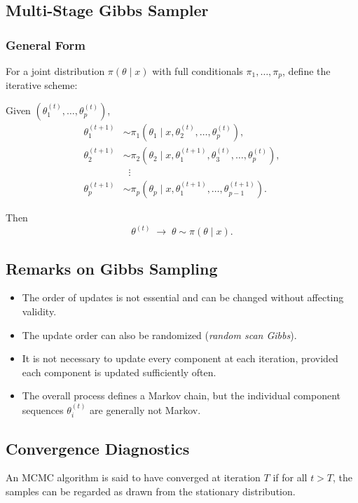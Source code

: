 \documentclass[12pt,oneside]{book}
\numberwithin{equation}{section}
\theoremstyle{definition}
\theoremstyle{plain}
\theoremstyle{remark}
\begin{document}
\subsection{Multi-Stage Gibbs Sampler}

\subsubsection*{General Form}

For a joint distribution $\pi(\theta \mid x)$ with full conditionals $\pi_1, \ldots, \pi_p$, define the iterative scheme:

Given $(\theta_1^{(t)}, \ldots, \theta_p^{(t)})$,
\[
\begin{aligned}
\theta_1^{(t+1)} &\sim \pi_1(\theta_1 \mid x, \theta_2^{(t)}, \ldots, \theta_p^{(t)}), \\
\theta_2^{(t+1)} &\sim \pi_2(\theta_2 \mid x, \theta_1^{(t+1)}, \theta_3^{(t)}, \ldots, \theta_p^{(t)}), \\
&\;\;\vdots \\
\theta_p^{(t+1)} &\sim \pi_p(\theta_p \mid x, \theta_1^{(t+1)}, \ldots, \theta_{p-1}^{(t+1)}).
\end{aligned}
\]

Then
\[
\theta^{(t)} \;\to\; \theta \sim \pi(\theta \mid x).
\]

\subsection{Remarks on Gibbs Sampling}

\begin{itemize}
\item The order of updates is not essential and can be changed without affecting validity.
\item The update order can also be randomized (\emph{random scan Gibbs}).
\item It is not necessary to update every component at each iteration, provided each component is updated sufficiently often.
\item The overall process defines a Markov chain, but the individual component sequences $\theta_i^{(t)}$ are generally not Markov.
\end{itemize}

\subsection{Convergence Diagnostics}

An MCMC algorithm is said to have converged at iteration $T$ if for all $t > T$, the samples can be regarded as drawn from the stationary distribution.
\end{document}
